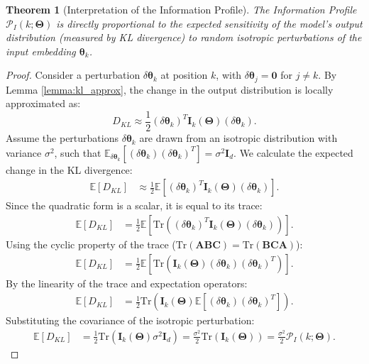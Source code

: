 \documentclass{article}
\newtheorem{theorem}{Theorem}[section]
\theoremstyle{definition}
\begin{document}
\begin{theorem}[Interpretation of the Information Profile]
\label{thm:profile_interpretation}
The Information Profile $\mathcal{P}_I(k; \mathbf{\Theta})$ is directly proportional to the expected sensitivity of the model's output distribution (measured by KL divergence) to random isotropic perturbations of the input embedding $\boldsymbol{\theta}_k$.
\end{theorem}
\begin{proof}
Consider a perturbation $\delta\boldsymbol{\theta}_k$ at position $k$, with $\delta\boldsymbol{\theta}_j=\mathbf{0}$ for $j\neq k$. By Lemma \ref{lemma:kl_approx}, the change in the output distribution is locally approximated as:
\begin{equation}
    D_{KL} \approx \frac{1}{2} (\delta\boldsymbol{\theta}_k)^T \mathbf{I}_k(\mathbf{\Theta}) (\delta\boldsymbol{\theta}_k).
\end{equation}
Assume the perturbations $\delta\boldsymbol{\theta}_k$ are drawn from an isotropic distribution with variance $\sigma^2$, such that $\mathbb{E}_{\delta\boldsymbol{\theta}_k}[(\delta\boldsymbol{\theta}_k)(\delta\boldsymbol{\theta}_k)^T] = \sigma^2 \mathbf{I}_d$. We calculate the expected change in the KL divergence:
\begin{align}
    \mathbb{E}[D_{KL}] &\approx \frac{1}{2} \mathbb{E}[(\delta\boldsymbol{\theta}_k)^T \mathbf{I}_k(\mathbf{\Theta}) (\delta\boldsymbol{\theta}_k)].
\end{align}
Since the quadratic form is a scalar, it is equal to its trace:
\begin{align}
    \mathbb{E}[D_{KL}] &= \frac{1}{2} \mathbb{E}[\text{Tr}((\delta\boldsymbol{\theta}_k)^T \mathbf{I}_k(\mathbf{\Theta}) (\delta\boldsymbol{\theta}_k))].
\end{align}
Using the cyclic property of the trace ($\text{Tr}(\mathbf{A}\mathbf{B}\mathbf{C}) = \text{Tr}(\mathbf{B}\mathbf{C}\mathbf{A})$):
\begin{align}
    \mathbb{E}[D_{KL}] &= \frac{1}{2} \mathbb{E}[\text{Tr}(\mathbf{I}_k(\mathbf{\Theta}) (\delta\boldsymbol{\theta}_k)(\delta\boldsymbol{\theta}_k)^T)].
\end{align}
By the linearity of the trace and expectation operators:
\begin{align}
    \mathbb{E}[D_{KL}] &= \frac{1}{2} \text{Tr}(\mathbf{I}_k(\mathbf{\Theta}) \mathbb{E}[(\delta\boldsymbol{\theta}_k)(\delta\boldsymbol{\theta}_k)^T]).
\end{align}
Substituting the covariance of the isotropic perturbation:
\begin{align}
    \mathbb{E}[D_{KL}] &= \frac{1}{2} \text{Tr}(\mathbf{I}_k(\mathbf{\Theta}) \sigma^2 \mathbf{I}_d) = \frac{\sigma^2}{2} \text{Tr}(\mathbf{I}_k(\mathbf{\Theta})) = \frac{\sigma^2}{2} \mathcal{P}_I(k; \mathbf{\Theta}).
\end{align}
\end{proof}
\end{document}

